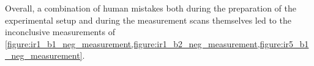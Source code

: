 Overall, a combination of human mistakes both during the preparation of the experimental setup and during the measurement scans themselves led to the inconclusive measurements of \cref{figure:ir1_b1_neg_measurement,figure:ir1_b2_neg_measurement,figure:ir5_b1_neg_measurement}.

\glsresetall                                     %
